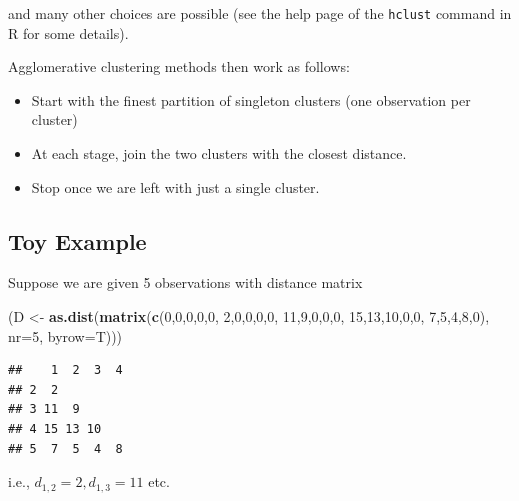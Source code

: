 \documentclass[
]{book}
\newenvironment{Shaded}{\begin{snugshade}}{\end{snugshade}}
\newcommand{\AttributeTok}[1]{\textcolor[rgb]{0.13,0.29,0.53}{#1}}
\newcommand{\DecValTok}[1]{\textcolor[rgb]{0.00,0.00,0.81}{#1}}
\newcommand{\FunctionTok}[1]{\textcolor[rgb]{0.13,0.29,0.53}{\textbf{#1}}}
\newcommand{\NormalTok}[1]{#1}
\newcommand{\OtherTok}[1]{\textcolor[rgb]{0.56,0.35,0.01}{#1}}
\theoremstyle{definition}
\theoremstyle{definition}
\theoremstyle{definition}
\theoremstyle{definition}
\theoremstyle{remark}
\begin{document}
and many other choices are possible (see the help page of the \texttt{hclust} command in R for some details).

Agglomerative clustering methods then work as follows:

\begin{itemize}
\item
  Start with the finest partition of singleton clusters (one observation per cluster)
\item
  At each stage, join the two clusters with the closest distance.
\item
  Stop once we are left with just a single cluster.
\end{itemize}

\subsection{Toy Example}\label{toy-example}

Suppose we are given 5 observations with distance matrix

\begin{Shaded}
\begin{Highlighting}[]
\NormalTok{(D }\OtherTok{\textless{}{-}} \FunctionTok{as.dist}\NormalTok{(}\FunctionTok{matrix}\NormalTok{(}\FunctionTok{c}\NormalTok{(}\DecValTok{0}\NormalTok{,}\DecValTok{0}\NormalTok{,}\DecValTok{0}\NormalTok{,}\DecValTok{0}\NormalTok{,}\DecValTok{0}\NormalTok{,}
                      \DecValTok{2}\NormalTok{,}\DecValTok{0}\NormalTok{,}\DecValTok{0}\NormalTok{,}\DecValTok{0}\NormalTok{,}\DecValTok{0}\NormalTok{,}
                      \DecValTok{11}\NormalTok{,}\DecValTok{9}\NormalTok{,}\DecValTok{0}\NormalTok{,}\DecValTok{0}\NormalTok{,}\DecValTok{0}\NormalTok{,}
                      \DecValTok{15}\NormalTok{,}\DecValTok{13}\NormalTok{,}\DecValTok{10}\NormalTok{,}\DecValTok{0}\NormalTok{,}\DecValTok{0}\NormalTok{,}
                      \DecValTok{7}\NormalTok{,}\DecValTok{5}\NormalTok{,}\DecValTok{4}\NormalTok{,}\DecValTok{8}\NormalTok{,}\DecValTok{0}\NormalTok{), }\AttributeTok{nr=}\DecValTok{5}\NormalTok{, }\AttributeTok{byrow=}\NormalTok{T)))}
\end{Highlighting}
\end{Shaded}

\begin{verbatim}
##    1  2  3  4
## 2  2         
## 3 11  9      
## 4 15 13 10   
## 5  7  5  4  8
\end{verbatim}

i.e., \(d_{1,2}=2, d_{1,3}=11\) etc.
\end{document}
